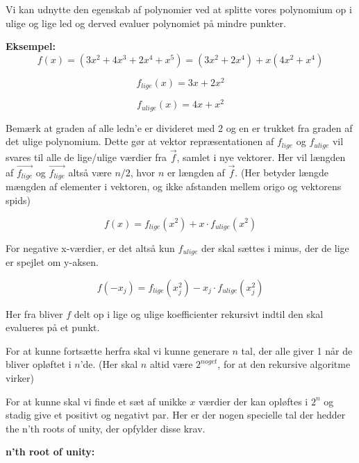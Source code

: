 \documentclass[11pt,a4paper]{article}
\begin{document}
Vi kan udnytte den egenskab af polynomier ved at splitte vores polynomium op i ulige og lige led
og derved evaluer polynomiet på mindre punkter.

\textbf{Eksempel:}
$$
f(x) = (3x^2 + 4x^3 + 2x^4 + x^5) = (3x^2 + 2x^4) + x(4x^2 + x^4)
$$

$$
f_{lige}(x) = 3x + 2x^2
$$

$$
f_{ulige}(x) = 4x + x^2
$$

Bemærk at graden af alle ledn'e er divideret med 2 og en er trukket fra graden af det ulige polynomium.
Dette gør at vektor repræsentationen af \(f_{lige}\) og \(f_{ulige}\) vil svares til alle de lige/ulige værdier fra \(\vec{f}\),
samlet i nye vektorer. Her vil længden af \({\vec{f_{lige}}}\) og \({\vec{f_{lige}}}\) altså være \(n/2\), hvor \(n\) er længden af \(\vec{f}\).
(Her betyder længde mængden af elementer i vektoren, og ikke afstanden mellem origo og vektorens spids)

$$
f(x) = f_{lige}(x^2) + x \cdot f_{ulige}(x^2)
$$

For negative x-værdier, er det altså kun \(f_{ulige}\) der skal sættes i minus,
der de lige er spejlet om y-aksen.

$$
f(-x_j) = f_{lige}(x^2_j) - x_j \cdot f_{ulige}(x^2_j)
$$

Her fra bliver \(f\) delt op i lige og ulige koefficienter rekursivt indtil den skal evalueres på et punkt.

For at kunne fortsætte herfra skal vi kunne generare \(n\) tal, der alle giver 1 når de bliver opløftet i \(n\)'de.
(Her skal \(n\) altid være \(2^{noget}\), for at den rekursive algoritme virker)

For at kunne skal vi finde et sæt af unikke \(x\) værdier der kan opløftes i \(2^n\) og stadig give et positivt og negativt par.
Her er der nogen specielle tal der hedder the n'th roots of unity, der opfylder disse krav.

\textbf{n'th root of unity:}
\end{document}
